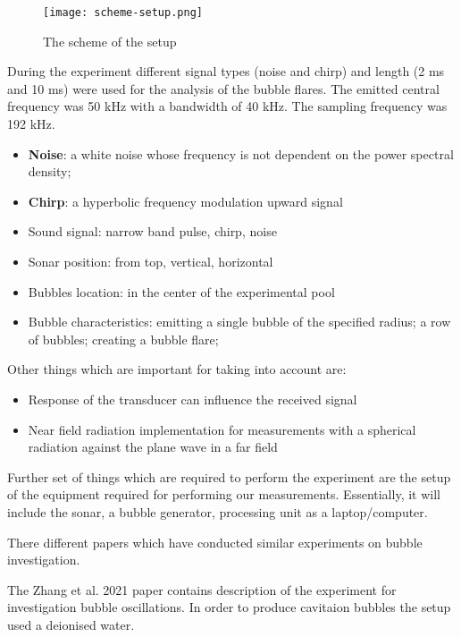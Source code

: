 \begin{figure}[H]
    \centering
    \texttt{[image: scheme-setup.png]}
    \caption{The scheme of the setup}
    \label{fig:scheme-setup}
\end{figure}


During the experiment different signal types (noise and chirp) and length (2 ms and 10 ms) were used for the analysis of the bubble flares. The emitted central frequency was 50 kHz with a bandwidth of 40 kHz. The sampling frequency was 192 kHz.
\begin{itemize}
    \item \textbf{Noise}: a white noise whose frequency is not dependent on the power spectral density\cite*{ainslie_principles_2010};  
    \item \textbf{Chirp}: a hyperbolic frequency modulation upward signal 
\end{itemize}

\begin{itemize}
    \item  Sound signal: narrow band pulse, chirp, noise
    \item Sonar position: from top, vertical, horizontal
    \item Bubbles location: in the center of the experimental pool
   \item Bubble characteristics: emitting a single bubble of the specified radius; a row of bubbles; 
   creating a bubble flare;
\end{itemize}
Other things which are important for taking into account are:
\begin{itemize}
    \item Response of the transducer can influence the received signal
    \item Near field radiation implementation for measurements with a spherical radiation against the plane wave in a far field
\end{itemize}

Further set of things which are required to perform the experiment are the setup of the equipment required for performing our measurements. 
Essentially, it will include the sonar, a bubble generator, processing unit as a laptop/computer.

There different papers which have conducted similar experiments on bubble investigation. 

The Zhang et al. 2021\cite{zhang_experimental_2021} paper contains description of the experiment for investigation bubble oscillations. In order to produce cavitaion bubbles the setup used a deionised water.

